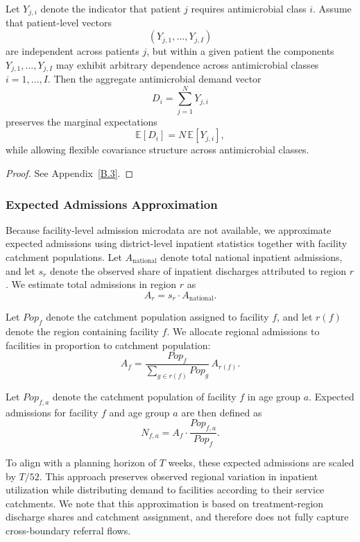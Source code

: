 \documentclass{article}
\begin{document}
\begin{theorem}
\label{thm:aggregation}
Let $Y_{j,i}$ denote the indicator that patient $j$ requires antimicrobial class $i$.
Assume that patient-level vectors
\[
(Y_{j,1},\dots,Y_{j,I})
\]
are independent across patients $j$, but within a given patient the components
$Y_{j,1},\dots,Y_{j,I}$ may exhibit arbitrary dependence across antimicrobial
classes $i=1,\dots,I$.
Then the aggregate antimicrobial demand vector
\[
D_i = \sum_{j=1}^N Y_{j,i}
\]
preserves the marginal expectations
\[
\mathbb{E}[D_i] = N\,\mathbb{E}[Y_{j,i}],
\]
while allowing flexible covariance structure across antimicrobial classes.
\end{theorem}

\begin{proof}
See Appendix~\ref{B.3}.
\end{proof}

\subsubsection{Expected Admissions Approximation}

Because facility-level admission microdata are not available, we approximate expected admissions using district-level inpatient statistics together with facility catchment populations. Let \(A_{\text{national}}\) denote total national inpatient admissions, and let \(s_r\) denote the observed share of inpatient discharges attributed to region \(r\). We estimate total admissions in region \(r\) as
\[
A_r = s_r \cdot A_{\text{national}}.
\]

Let \(Pop_f\) denote the catchment population assigned to facility \(f\), and let \(r(f)\) denote the region containing facility \(f\). We allocate regional admissions to facilities in proportion to catchment population:
\[
A_f = \frac{Pop_f}{\sum_{g \in r(f)} Pop_g}\, A_{r(f)}.
\]

Let \(Pop_{f,a}\) denote the catchment population of facility \(f\) in age group \(a\). Expected admissions for facility \(f\) and age group \(a\) are then defined as
\[
N_{f,a} = A_f \cdot \frac{Pop_{f,a}}{Pop_f}.
\]

To align with a planning horizon of \(T\) weeks, these expected admissions are scaled by \(T/52\). This approach preserves observed regional variation in inpatient utilization while distributing demand to facilities according to their service catchments. We note that this approximation is based on treatment-region discharge shares and catchment assignment, and therefore does not fully capture cross-boundary referral flows.
\end{document}
